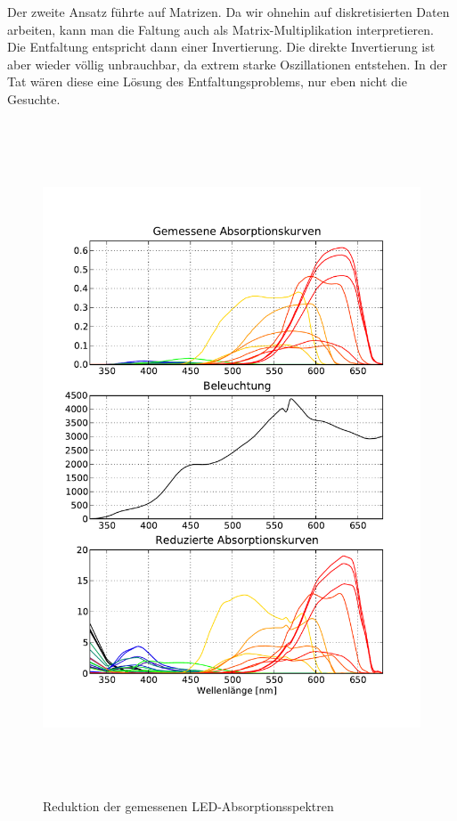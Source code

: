 \documentclass[11pt]{scrartcl}
\begin{document}
Der zweite Ansatz führte auf Matrizen.
Da wir ohnehin auf diskretisierten Daten arbeiten, kann man die Faltung auch als Matrix-Multiplikation interpretieren.
Die Entfaltung entspricht dann einer Invertierung.
Die direkte Invertierung ist aber wieder völlig unbrauchbar, da extrem starke Oszillationen entstehen.
In der Tat wären diese eine Lösung des Entfaltungsproblems, nur eben nicht die Gesuchte.

\begin{figure}[H]
\begin{center}
\includegraphics[height=20cm]{spektren_mit_halogen.pdf}
\end{center}
\vspace{-1.5\baselineskip}
\caption{Reduktion der gemessenen LED-Absorptionsspektren}
\label{fig:reduktion}
\end{figure}
\end{document}
